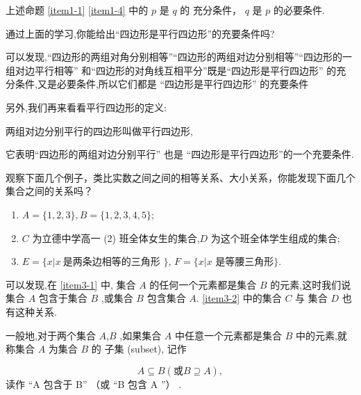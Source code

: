\documentclass[a4paper]{ctexart}
\begin{document}
上述命题 \ref{item1-1} \ref{item1-4} 中的 $p$ 是  $q$ 的 充分条件， $q$ 是 $p$ 的必要条件.

\begin{explore0} 
	通过上面的学习,你能给出``四边形是平行四边形''的充要条件吗?
\end{explore0}
可以发现,``四边形的两组对角分别相等''``四边形的两组对边分别相等''``四边形的一组对边平行相等''
和``四边形的对角线互相平分''既是``四边形是平行四边形'' 的充分条件,又是必要条件,所以它们都是
``四边形是平行四边形''  的充要条件

另外,我们再来看看平行四边形的定义:
\begin{center}
	两组对边分别平行的四边形叫做平行四边形,
\end{center} 
它表明``四边形的两组对边分别平行'' 也是 ``四边形是平行四边形''的一个充要条件.

\begin{observe0}
	观察下面几个例子，类比实数之间之间的相等关系、大小关系，你能发现下面几个集合之间的关系吗？
	\begin{enumerate}
		\item $A = \{ 1,2,3 \},B = \{1,2,3,4,5  \} ;$  \label{item3-1}
		\item $C$ 为立德中学高一 (2) 班全体女生的集合,$D$ 为这个班全体学生组成的集合;  \label{item3-2}
		\item $E = \{x|  x \  \text{是两条边相等的三角形 } \} $, $F =  \{x| x \text{\ 是等腰三角形}  \} $. \label{item3-3}
	\end{enumerate}
\end{observe0}




可以发现,在 \ref{item3-1} 中, 集合 $A$ 的任何一个元素都是集合 $B$ 的元素,这时我们说集合 $A$ 包含于集合 $B$ ,或集合 $B$ 包含集合 $A$.  \ref{item3-2} 中的集合 $C$ 与 集合 $D$ 也有这种关系.

\begin{figwindow}
	一般地,对于两个集合 $A$,$B$ ,如果集合 $A$ 中任意一个元素都是集合 $B$ 中的元素,就称集合 $A$ 为集合 $B$ 的  \textcolor{textcolor1}{子集} (subset), 记作 
\end{figwindow}

\[  A \subseteq B ( \text{或} B  \supseteq A) ,
\]
读作 ``A 包含于 B'' （或 ``B 包含 A ''） .
\end{document}
